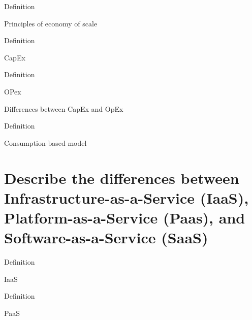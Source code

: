\documentclass{scrartcl}
\newenvironment{flashcard}[2][]{%
    #1
    \vfill
    \centerline{\Large{#2}}
    \vfill
    \newpage
}
{\newpage}
\newcommand{\sectioncard}[1]{
    \vspace*{\stretch{1}}
    \section{#1}
    \vspace*{\stretch{1}}
    \pagebreak
}
\begin{document}
    \begin{flashcard}[Definition]{Principles of economy of scale}

    \end{flashcard}

    \begin{flashcard}[Definition]{CapEx}

    \end{flashcard}

    \begin{flashcard}[Definition]{OPex}

    \end{flashcard}

    \begin{flashcard}{Differences between CapEx and OpEx}

    \end{flashcard}


    \begin{flashcard}[Definition]{Consumption-based model}

    \end{flashcard}

    \sectioncard{Describe the differences between Infrastructure-as-a-Service (IaaS), Platform-as-a-Service (Paas), and Software-as-a-Service (SaaS)}

    \begin{flashcard}[Definition]{IaaS}

    \end{flashcard}

    \begin{flashcard}[Definition]{PaaS}

    \end{flashcard}
\end{document}
